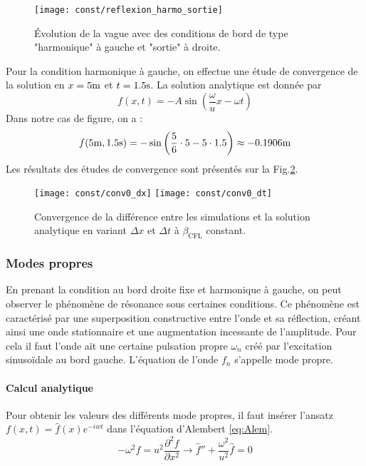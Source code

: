 \documentclass[a4paper,12pt,oneside]{article}
\def \be {\begin{equation}}
\def \ee {\end{equation}}
\def \dx  {\Delta x}
\def \dt  {\Delta t}
\begin{document}
\begin{figure}[H]
    \centering
    \texttt{[image: const/reflexion\_harmo\_sortie]}
    \caption{Évolution de la vague avec des conditions de bord de type "harmonique" à gauche et "sortie" à droite.}
    \label{fig:reflexion_harmo_sortie}
\end{figure}

Pour la condition harmonique à gauche, on effectue une étude de convergence de la solution en $x=5 \rm m$ et $t=1.5 \rm s$. La solution analytique est donnée par 
$$ f(x,t) = -A \sin{\left(\frac{\omega}{u}x-\omega t\right)} $$
Dans notre cas de figure, on a :
$$f(5{\rm m},1.5{\rm s})=-\sin{\left(\frac{5}{6} \cdot 5-5 \cdot 1.5\right)} \approx -0.1906 \rm m$$ 
Les résultats des études de convergence sont présentés sur la Fig.\ref{fig:conv0}.

\begin{figure}[H]
    \centering
    \texttt{[image: const/conv0\_dx]}
    \texttt{[image: const/conv0\_dt]}
    \caption{Convergence de la différence entre les simulations et la solution analytique en variant $\dx$ et $\dt$ à $\beta_\text{CFL}$ constant.}
    \label{fig:conv0}
\end{figure}

\subsubsection{Modes propres}
En prenant la condition au bord droite fixe et harmonique à gauche, on peut observer le phénomène de résonance sous certaines conditions. Ce phénomène est caractérisé par une superposition constructive entre l'onde et sa réflection, créant ainsi une onde stationnaire et une augmentation incessante de l'amplitude. Pour cela il faut l'onde ait une certaine pulsation propre  $\omega_n$ créé par l'excitation sinusoïdale au bord gauche. L'équation de l'onde $f_n$ s'appelle mode propre.

\paragraph{Calcul analytique}
Pour obtenir les valeurs des différents mode propres, il faut insérer l'ansatz $f(x,t)=\hat{f}(x)e^{-iwt}$ dans l'équation d'Alembert \eqref{eq:Alem}.
\be -\omega^2 f=u^2 \frac{\partial^2f}{\partial x^2} \rightarrow \hat{f}''+\frac{\omega^2}{u^2}\hat{f}=0\ee
\end{document}
